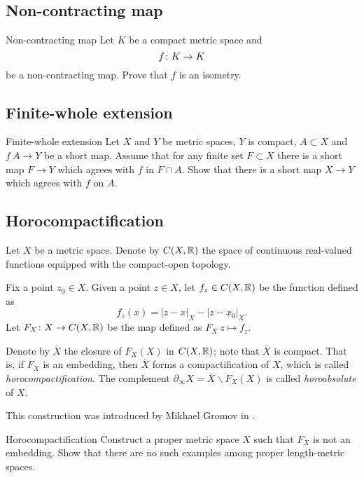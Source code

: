 \subsection*{Non-contracting map\easy}

\begin{pr}{\easy}{Non-contracting map}\label{Noncontracting map}
Let $K$  be a compact metric space and
\[f\:K\z\to K\] 
be a non-contracting map.
Prove that $f$ is an isometry.
\end{pr}

\subsection*{Finite-whole extension}

\begin{pr}{}{Finite-whole extension}\label{Finite-whole extension}
Let $X$ and $Y$ be metric spaces, 
$Y$ is compact,
$A\subset X$ and $f\:A\to Y$ be a short map.
Assume that for any finite set $F\subset X$ there is a short map $F \to Y$
which agrees with $f$ in $F\cap A$.
Show that there is a short map $X\to  Y$ which agrees with $f$ on $A$.
\end{pr}


\subsection*{Horocompactification\easy}

Let $X$ be a metric space.
Denote by $C(X,\mathbb{R})$ the space of continuous real-valued functions
equipped with the compact-open topology.

Fix a point $z_0\in X$.
Given a point $z\in X$, let $f_z\in C(X,\mathbb{R})$ be the function defined as 
\[f_z(x)=|z-x|_X-|z-x_0|_X.\]
Let $F_X\colon X\to C(X,\mathbb{R})$ be the map 
defined as $F_X\:z\mapsto f_z$.

Denote by $\bar X$ 
the closure of $F_X(X)$ in $C(X,\mathbb{R})$;
note that $\bar X$ is compact.
That is, 
if $F_X$ is an embedding, 
then $\bar X$ forms a compactification of $X$,
which is called \emph{horocompactification}.
The complement 
$\partial_\infty X=\bar X\backslash F_X(X)$ 
is called {}\emph{horoabsolute} of $X$.

This construction was introduced by Mikhael Gromov in \cite{gromov-hyperbolic}.


\begin{pr}{\easy}{Horocompactification}\label{Horocompactification}
Construct a proper metric space $X$
such that $F_X$ is not an embedding.
Show that there are no such examples among proper length-metric spaces.
\end{pr}

